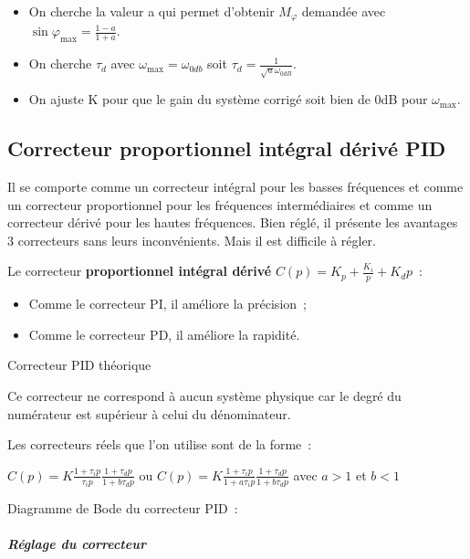 \begin{itemize}
\item
  On cherche la valeur a qui permet d'obtenir \(M_{\varphi}\) demandée avec \(\sin\varphi_{\max} = \frac{1 - a}{1 + a}\).
\item
  On cherche \(\tau_{d}\) avec \(\omega_{\max} = \omega_{0db}\) soit \(\tau_{d} = \frac{1}{\sqrt{a}\omega_{0dB}}\).
\item
  On ajuste K pour que le gain du système corrigé soit bien de 0dB pour \(\omega_{\max}\).
\end{itemize}

\hypertarget{correcteur-proportionnel-intuxe9gral-duxe9rivuxe9-pid}{%
\subsection{Correcteur proportionnel intégral dérivé PID}\label{correcteur-proportionnel-intuxe9gral-duxe9rivuxe9-pid}}

Il se comporte comme un correcteur intégral pour les basses fréquences et comme un correcteur proportionnel pour les fréquences intermédiaires et comme un correcteur dérivé pour les hautes fréquences. Bien réglé, il présente les avantages 3 correcteurs sans leurs inconvénients. Mais il est difficile à régler.

Le correcteur \textbf{proportionnel intégral dérivé} \(C(p) = K_{p} + \frac{K_{i}}{p} + K_{d}p\)~:

\begin{itemize}
\item
  Comme le correcteur PI, il améliore la précision~;
\item
  Comme le correcteur PD, il améliore la rapidité.
\end{itemize}

Correcteur PID théorique

Ce correcteur ne correspond à aucun système physique car le degré du numérateur est supérieur à celui du dénominateur.

Les correcteurs réels que l'on utilise sont de la forme~:

\(C(p) = K\frac{1 + \tau_{i}p}{\tau_{i}p}\frac{1 + \tau_{d}p}{1 + b\tau_{d}p}\) ou \(C(p) = K\frac{1 + \tau_{i}p}{1 + a\tau_{i}p}\frac{1 + \tau_{d}p}{1 + b\tau_{d}p}\) avec \(a > 1\) et \(b < 1\)

Diagramme de Bode du correcteur PID~:

\hypertarget{ruxe9glage-du-correcteur-3}{%
\subparagraph*{Réglage du correcteur}\label{ruxe9glage-du-correcteur-3}}

